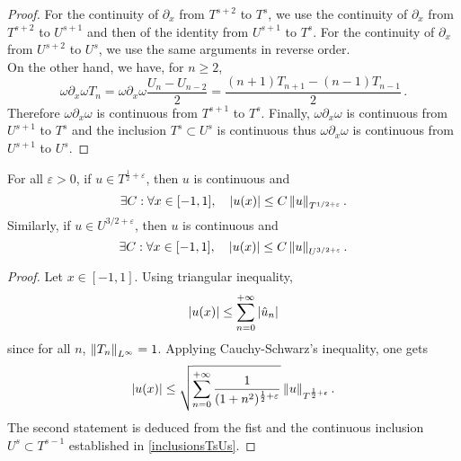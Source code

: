 \documentclass[a4paper]{article}
\begin{document}
\begin{proof}
	For the continuity of $\partial_x$ from $T^{s+2}$ to $T^s$, we use the continuity of $\partial_x$ from $T^{s+2}$ to $U^{s+1}$ and then of the identity from $U^{s+1}$ to $T^s$. For the continuity of $\partial_x$ from $U^{s+2}$ to $U^s$, we use the same arguments in reverse order. \\
	On the other hand, we have, for $n \geq 2$,
	\[\omega \partial_x \omega T_n = \omega\partial_x \omega \frac{U_n - U_{n-2}}{2} = \frac{(n+1)T_{n+1} - (n-1)T_{n-1}}{2}\,.\]
	Therefore $\omega \partial_x \omega$ is continuous from $T^{s+1}$ to $T^s$. Finally, $\omega \partial_x \omega$ is continuous from $U^{s+1}$ to $T^s$ and the inclusion $T^s \subset U^s$ is continuous thus $\omega \partial_x \omega$ is continuous from $U^{s+1}$ to $U^s$.  
\end{proof}
\begin{Lem}
	\label{LemInjectionsContinues}
	For all $\varepsilon >0$, if $u \in T^{\frac{1}{2} + \varepsilon}$, then $u$ is continuous and
	\[ \exists C : \forall x \in [-1,1], \quad \left\lvert u(x) \right\rvert \leq C \left\|u\right\|_{T^{1/2 + \varepsilon}}.\]	
	Similarly, if $u \in U^{3/2 + \varepsilon}$, then $u$ is continuous and 
	\[ \exists C : \forall x \in [-1,1], \quad \left\lvert u(x) \right\rvert \leq C \left\|u\right\|_{U^{3/2 + \varepsilon}}.\]
\end{Lem}
\begin{proof}
	Let $x \in [-1,1]$. Using triangular inequality,
	\[\left\lvert u(x) \right\rvert \leq \sum_{n = 0}^{+ \infty} \left\lvert \hat{u}_n \right\rvert\]
	since for all $n$, $\left\|T_n\right\|_{L^\infty} = 1$. Applying Cauchy-Schwarz's inequality, one gets
	\[\left\lvert u(x) \right\rvert \leq \sqrt{\sum_{n= 0}^{+ \infty} \frac{1}{(1+ n^2)^{\frac{1}{2}+ \varepsilon}}} \left\|u\right\|_{T^{\frac{1}{2} + \varepsilon}}.\]
	The second statement is deduced from the fist and the continuous inclusion $U^{s} \subset T^{s-1}$ established in \autoref{inclusionsTsUs}. 
\end{proof}	
\end{document}
